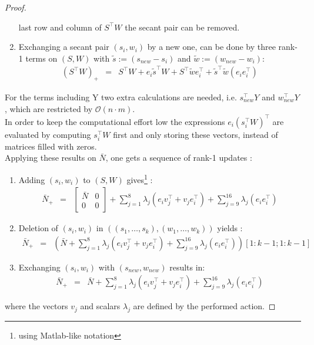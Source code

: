 \documentclass{svmult}
\begin{document}
\begin{proof}
\begin{enumerate}
			last row and column of $S^{\top}W$ the secant pair can be removed.
		\item Exchanging a secant pair $(s_i,w_i)$ by a new one, can be done by three rank-1 terms on $(S,W)$ with $\tilde{s}:= (s_{new}-s_i)$ and 
			$\tilde{w}:= (w_{new}-w_i)$:
			\begin{eqnarray*}
				(S^{\top}W)_+&=&S^{\top}W+e_i\tilde{s}^{\top}W+ S^{\top}\tilde{w}e_i^{\top}  + \tilde{s}^{\top}\tilde{w} (e_i e_i^{\top})
			\end{eqnarray*}
	\end{enumerate}	
	For the terms including Y two extra calculations are needed, i.e.
	$s_{new}^{\top}Y$ and $w_{new}^{\top}Y$, which are restricted by $\mathcal{O}(n\cdot m)$.\\
	In order to keep the computational effort low the expressions $e_i (s_i^{\top}W)^{\top}$ are evaluated by computing $s_i^{\top}W$ first and only storing 
	these vectors, instead of matrices filled with zeros.\\
	Applying these results on $\bar{N}$, one gets a sequence of rank-1 updates :\newpage
	\begin{enumerate}
		\item Adding $(s_i,w_i)$ to $(S,W)$ gives\footnote[1]{using Matlab-like notation} :
			\begin{eqnarray*}
				\bar{N}_+&=&\left[\begin{array}{lc}
								\bar{N} & 0\\
								0 & 0
							\end{array}\right]
						+\sum_{j=1}^8 \lambda_j ( e_i v_j^{\top} + v_je_i^{\top})
						+\sum_{j=9}^{16} \lambda_j ( e_i e_i^{\top})
			\end{eqnarray*}
		\item Deletion of $(s_i,w_i)$ in $( (s_1,\dots,s_k),(w_1,\dots,w_k) )$ yields \footnotemark[\value{footnote}]:
			\begin{eqnarray*}
				\bar{N}_+&=& \left(\bar{N}	+\sum_{j=1}^8 \lambda_j ( e_i v_j^{\top} + v_je_i^{\top})
						+\sum_{j=9}^{16} \lambda_j ( e_i e_i^{\top})\right)[1:k-1 ; 1:k-1]\mbox{}
			\end{eqnarray*}
		\item Exchanging $(s_i,w_i)$ with $(s_{new},w_{new})$ results in:
			\begin{eqnarray*}
				\bar{N}_+&=&\bar{N}	+\sum_{j=1}^8 \lambda_j ( e_i v_j^{\top} + v_je_i^{\top})
						+\sum_{j=9}^{16} \lambda_j ( e_i e_i^{\top})
			\end{eqnarray*}
	\end{enumerate}
	where the vectors $v_j$  and scalars $\lambda_j$ are defined by the performed action.
\end{proof}
\end{document}
